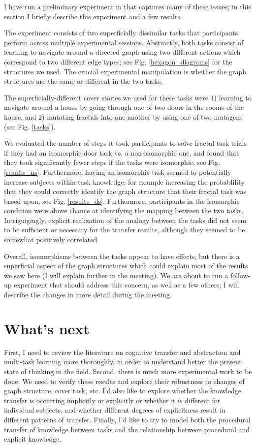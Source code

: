 \documentclass[10pt]{article}
\begin{document}
I have run a preliminary experiment in that captures many of these issues; in this section I briefly describe this experiment and a few results. \par
The experiment consists of two superficially dissimilar tasks that participants perform across multiple experimental sessions. Abstractly, both tasks consist of learning to navigate around a directed graph using two different actions which correspond to two different edge types; see Fig. \ref{hexagon_diagrams} for the structures we used. The crucial experimental manipulation is whether the graph structures are the same or different in the two tasks. \par
The superficially-different cover stories we used for these tasks were 1) learning to navigate around a house by going through one of two doors in the rooms of the house, and 2) mutating fractals into one another by using one of two mutagens (see Fig. \ref{tasks}). \par 
We evaluated the number of steps it took participants to solve fractal task trials if they had an isomorphic door task vs. a non-isomorphic one, and found that they took significantly fewer steps if the tasks were isomorphic, see Fig. \ref{results_ns}. Furthermore, having an isomorphic task seemed to potentially increase subjects within-task knowledge, for example increasing the probablility that they could correctly identify the graph structure that their fractal task was based upon, see Fig. \ref{results_ds}. Furthermore, participants in the isomorphic condition were above chance at identifying the mapping between the two tasks. Intriguigingly, explicit realization of the analogy between the tasks did not seem to be sufficient or necessary for the transfer results, although they seemed to be somewhat positively correlated.\par
Overall, isomorphisms between the tasks appear to have effects, but there is a superficial aspect of the graph structures which could explain most of the results we saw here (I will explain further in the meeting). We are about to run a follow-up experiment that should address this concern, as well as a few others; I will describe the changes in more detail during the meeting. 
\section{What's next}
First, I need to review the literature on cognitive transfer and abstraction and multi-task learning more thoroughly, in order to understand better the present state of thinking in the field. Second, there is much more experimental work to be done. We need to verify these results and explore their robustness to changes of graph structure, cover task, etc. I'd also like to explore whether the knowledge transfer is occurring implicitly or explicitly or whether it is different for individual subjects, and whether different degrees of explicitness result in different patterns of transfer. Finally, I'd like to try to model both the procedural transfer of knowledge between tasks and the relationship between procedural and explicit knowledge. \par 



\end{document}
